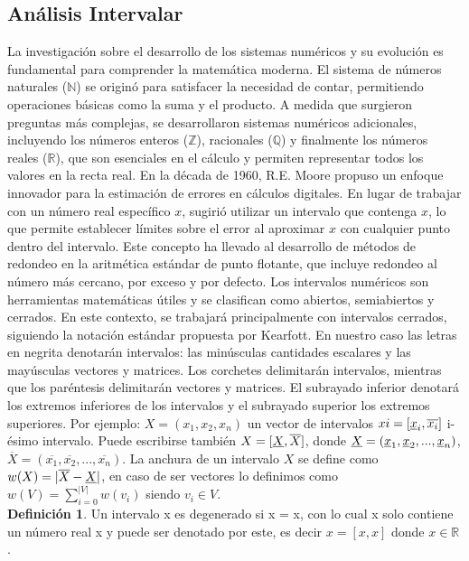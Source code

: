     \subsection*{ \Large Análisis Intervalar}

La investigación sobre el desarrollo de los sistemas numéricos y su evolución es fundamental para comprender la matemática moderna. El sistema de números naturales
($\mathbb{N}$) se originó para satisfacer la necesidad de contar, permitiendo operaciones básicas como la suma y el producto. A medida que surgieron preguntas más
complejas, se desarrollaron sistemas numéricos adicionales, incluyendo los números enteros ($\mathbb{Z}$), racionales ($\mathbb{Q} $) y finalmente los números reales
 ($\mathbb{R}$), que son esenciales en el cálculo y permiten representar todos los valores en la recta real. En la década de 1960, R.E. Moore propuso un enfoque 
 innovador para la estimación de errores en cálculos digitales. En lugar de trabajar con un número real específico $x$, sugirió utilizar un intervalo que contenga
$x$, lo que permite establecer límites sobre el error al aproximar $x$ con cualquier punto dentro del intervalo. Este concepto ha llevado al desarrollo de métodos
de redondeo en la aritmética estándar de punto flotante, que incluye redondeo al número más cercano, por exceso y por defecto. Los intervalos numéricos son herramientas
matemáticas útiles y se clasifican como abiertos, semiabiertos y cerrados. En este contexto, se trabajará principalmente con intervalos cerrados, siguiendo la notación
estándar propuesta por Kearfott. En nuestro caso las letras en negrita denotarán intervalos: las minúsculas cantidades escalares y las mayúsculas vectores y matrices.
Los corchetes delimitarán intervalos, mientras que los paréntesis delimitarán vectores y matrices. El subrayado inferior denotará los extremos inferiores de los intervalos
y el subrayado superior los extremos superiores. Por ejemplo: $X = (x_1, x_2, x_n)$ un vector de intervalos $xi = [ \uline x_i, \overline{ x_i } ]$ i-ésimo intervalo.
Puede escribirse también $X = [ \uline X, \overline{ X } ]$, donde $\uline X = ( \uline x_1, \uline x_2, ..., \uline x_n)$, $\overline{X}= (\overline{x_1}, \overline{x_2}, ..., \overline{x_n})$.
La anchura de un intervalo $X$ se define como $w(X)=| \overline{X} - \uline X|$, en caso de ser vectores lo definimos como $w(V)=\sum_{i=0}^{|V|}w(v_i)$ siendo $v_i \in V$. \\

\textbf{ Definición 1}. Un intervalo x es degenerado si x = x, con lo cual x solo contiene un
número real x y puede ser denotado por este, es decir $x = [x,x]$ donde $x \in \mathbb{R}$.\\

